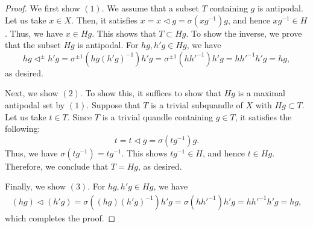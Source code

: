 \documentclass[10pt,a4paper]{amsart}
\newcommand{\qop}{\triangleleft}
\begin{document}
\begin{proof}
  We first show $(1)$.
  We assume that a subset $T$ containing $g$ is antipodal.
  Let us take $x \in X$.
  Then, it satisfies $x = x \qop g = \sigma(x g^{-1}) g$,
  and hence $xg^{-1} \in H$.
  Thus, we have $x \in Hg$.
  This shows that $T \subset Hg$.
  To show the inverse, we prove that the subset $Hg$ is antipodal.
  For $hg, h'g \in H g$, we have
  \[
    hg \qop^{\pm} h'g = \sigma^{\pm 1}(hg(h'g)^{-1}) h'g = \sigma^{\pm 1}(h h'^{-1})h'g = h h'^{-1}h'g = hg,
  \]
  as desired.

  Next, we show $(2)$.
  To show this, it suffices to show that $Hg$ is a maximal antipodal set by $(1)$.
  Suppose that $T$ is a trivial subquandle of $X$ with $Hg \subset T$.
  Let us take $t \in T$.
  Since $T$ is a trivial quandle containing $g \in T$, it satisfies the following:
  \[
    t = t \qop g = \sigma(tg^{-1})g.
  \]
  Thus, we have $\sigma(tg^{-1}) = tg^{-1}$.
  This shows $tg^{-1} \in H$, and hence $t \in Hg$.
  Therefore, we conclude that $T = Hg$, as desired.

  Finally, we show $(3)$.
  For $hg, h'g \in Hg$, we have
  \begin{align*}
      (hg) \qop (h'g) = \sigma((hg)(h'g)^{-1})h'g = \sigma(hh'^{-1})h'g = hh'^{-1}h'g = hg,
  \end{align*}
  which completes the proof.
\end{proof}
\end{document}
